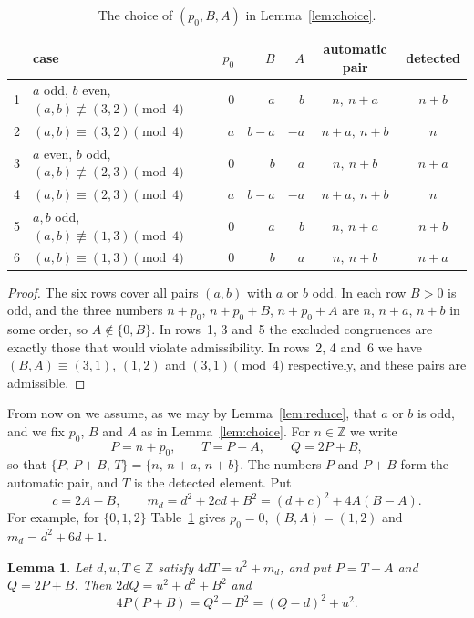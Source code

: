 \documentclass[11pt]{amsart}
\newtheorem{lemma}[theorem]{Lemma}
\theoremstyle{remark}
\theoremstyle{definition}
\numberwithin{equation}{section}
\newcommand{\Z}{\mathbb{Z}}
\begin{document}
\begin{table}[h]
\centering
\begin{tabular}{llrrrcc}
\toprule
& case & $p_0$ & $B$ & $A$ & automatic pair & detected\\
\midrule
1 & $a$ odd, $b$ even, $(a,b)\not\equiv(3,2)\pmod 4$ & $0$ & $a$ & $b$ & $n,\ n+a$ & $n+b$\\
2 & $(a,b)\equiv(3,2)\pmod 4$ & $a$ & $b-a$ & $-a$ & $n+a,\ n+b$ & $n$\\
3 & $a$ even, $b$ odd, $(a,b)\not\equiv(2,3)\pmod 4$ & $0$ & $b$ & $a$ & $n,\ n+b$ & $n+a$\\
4 & $(a,b)\equiv(2,3)\pmod 4$ & $a$ & $b-a$ & $-a$ & $n+a,\ n+b$ & $n$\\
5 & $a,b$ odd, $(a,b)\not\equiv(1,3)\pmod 4$ & $0$ & $a$ & $b$ & $n,\ n+a$ & $n+b$\\
6 & $(a,b)\equiv(1,3)\pmod 4$ & $0$ & $b$ & $a$ & $n,\ n+b$ & $n+a$\\
\bottomrule
\end{tabular}
\caption{The choice of $(p_0,B,A)$ in Lemma~\ref{lem:choice}.}
\label{tab:choice}
\end{table}

\begin{proof}
The six rows cover all pairs $(a,b)$ with $a$ or $b$ odd. In each row $B>0$ is odd, and the three numbers $n+p_0$, $n+p_0+B$, $n+p_0+A$ are $n$, $n+a$, $n+b$ in some order, so $A\notin\{0,B\}$. In rows~1, 3 and~5 the excluded congruences are exactly those that would violate admissibility. In rows~2, 4 and~6 we have $(B,A)\equiv(3,1)$, $(1,2)$ and $(3,1)\pmod 4$ respectively, and these pairs are admissible.
\end{proof}

From now on we assume, as we may by Lemma~\ref{lem:reduce}, that $a$ or $b$ is odd, and we fix $p_0$, $B$ and $A$ as in Lemma~\ref{lem:choice}. For $n\in\Z$ we write
\begin{equation}\label{eq:PTQ}
P=n+p_0,\qquad T=P+A,\qquad Q=2P+B,
\end{equation}
so that $\{P,\,P+B,\,T\}=\{n,\,n+a,\,n+b\}$. The numbers $P$ and $P+B$ form the automatic pair, and $T$ is the detected element. Put
\begin{equation}\label{eq:md}
c=2A-B,\qquad m_d=d^2+2cd+B^2=(d+c)^2+4A(B-A).
\end{equation}
For example, for $\{0,1,2\}$ Table~\ref{tab:choice} gives $p_0=0$, $(B,A)=(1,2)$ and $m_d=d^2+6d+1$.

\begin{lemma}\label{lem:identity}
Let $d,u,T\in\Z$ satisfy $4dT=u^2+m_d$, and put $P=T-A$ and $Q=2P+B$. Then $2dQ=u^2+d^2+B^2$ and
\[
4P(P+B)=Q^2-B^2=(Q-d)^2+u^2 .
\]
\end{lemma}
\end{document}

